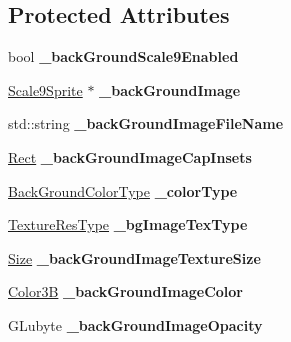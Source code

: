 \subsection*{Protected Attributes}
\begin{DoxyCompactItemize}
\item 
\mbox{\label{classui_1_1Layout_a4f47a5ad7e3f894d3225138a22df330d}} 
bool {\bfseries \+\_\+back\+Ground\+Scale9\+Enabled}
\item 
\mbox{\label{classui_1_1Layout_a400326acfb6b20996fa0b4575d651e4b}} 
\hyperlink{classui_1_1Scale9Sprite}{Scale9\+Sprite} $\ast$ {\bfseries \+\_\+back\+Ground\+Image}
\item 
\mbox{\label{classui_1_1Layout_ab5c08de3057798474ca56ea771a49055}} 
std\+::string {\bfseries \+\_\+back\+Ground\+Image\+File\+Name}
\item 
\mbox{\label{classui_1_1Layout_acc3fbfa75f4586fb59ce82ce639409a9}} 
\hyperlink{classRect}{Rect} {\bfseries \+\_\+back\+Ground\+Image\+Cap\+Insets}
\item 
\mbox{\label{classui_1_1Layout_a006ad9295b49a59ea222fa4270f15ca1}} 
\hyperlink{classui_1_1Layout_a2aad69f15823c5f22d8ed72bf2ac7472}{Back\+Ground\+Color\+Type} {\bfseries \+\_\+color\+Type}
\item 
\mbox{\label{classui_1_1Layout_addecb45417f318416580ed29ad2400c5}} 
\hyperlink{classui_1_1Widget_a040a65ec5ad3b11119b7e16b98bd9af0}{Texture\+Res\+Type} {\bfseries \+\_\+bg\+Image\+Tex\+Type}
\item 
\mbox{\label{classui_1_1Layout_a07aa0593749dcb935f89cfcad8db2bc0}} 
\hyperlink{classSize}{Size} {\bfseries \+\_\+back\+Ground\+Image\+Texture\+Size}
\item 
\mbox{\label{classui_1_1Layout_a6e76056af8b2abc02531d101df5d6665}} 
\hyperlink{structColor3B}{Color3B} {\bfseries \+\_\+back\+Ground\+Image\+Color}
\item 
\mbox{\label{classui_1_1Layout_a0f243612cdf9c1e4da60e56ff4c41eb2}} 
G\+Lubyte {\bfseries \+\_\+back\+Ground\+Image\+Opacity}

\end{DoxyCompactItemize}
